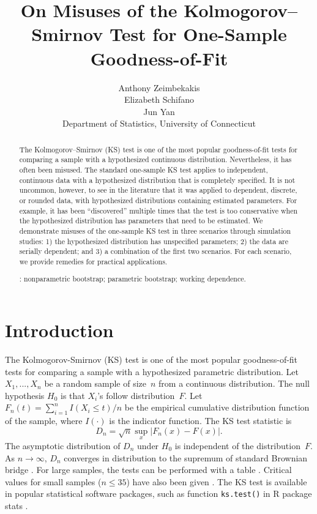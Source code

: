 \documentclass[12pt, letterpaper, titlepage]{article}
\title{On Misuses of the Kolmogorov--Smirnov Test for One-Sample Goodness-of-Fit}
\author{Anthony Zeimbekakis\\
  Elizabeth Schifano\\
  Jun Yan\\[1ex]
  Department of Statistics, University of Connecticut\\
}
\date{}
\begin{document}
\maketitle

\doublespace

\begin{abstract}
The Kolmogorov--Smirnov (KS) test is one of the most popular goodness-of-fit
tests for comparing a sample with a hypothesized continuous distribution.
Nevertheless, it has often been misused. The standard one-sample KS test applies
to independent, continuous data with a hypothesized distribution that is
completely specified. It is not uncommon, however, to see in the literature that
it was applied to dependent, discrete, or rounded data, with hypothesized
distributions containing estimated parameters. For example, it has been
``discovered'' multiple times that the test is too conservative when the 
hypothesized distribution has parameters that need to be estimated.
We demonstrate misuses of the one-sample KS test in
three scenarios through simulation studies:
1) the hypothesized distribution has unspecified parameters;
2) the data are serially dependent; and
3) a combination of the first two scenarios.
For each scenario, we provide remedies for practical applications.

\bigskip
{}:
nonparametric bootstrap;
parametric bootstrap;
working dependence.
\end{abstract}

\section{Introduction}
\label{sec:intro}

The Kolmogorov-Smirnov (KS) test is one of the most popular goodness-of-fit
tests for comparing a sample with a hypothesized parametric distribution.
Let $X_1, ..., X_n$ be a random sample of size~$n$ from a continuous
distribution. The null hypothesis $H_0$ is that $X_i$'s follow distribution~$F$.
Let $F_n(t) = \sum_{i=1}^n I(X_i \le t) / n$ be the empirical cumulative
distribution function of the sample, where $I(\cdot)$ is the indicator
function. The KS test statistic is
\begin{equation}
  \label{eq:ks_standard}
  D_n = \sqrt{n} \sup_x | F_{n}(x) - F(x) |.
\end{equation}
The asymptotic distribution of $D_n$ under $H_0$ is independent of the
distribution~$F$. As $n \to \infty$, $D_n$ converges in distribution to
the supremum of standard Brownian bridge \citep{kolmogorov1933sulla}. For large
samples, the tests can be performed with a table \citep{smirnov1948table}.
Critical values for small samples ($n \le 35$) have also been given
\citep{massey1951kolmogorov}. The KS test is available in popular
statistical software packages, such as function \texttt{ks.test()} in R package
\textsf{stats} \citep{R, marsaglia2003evaluating}.
\end{document}
